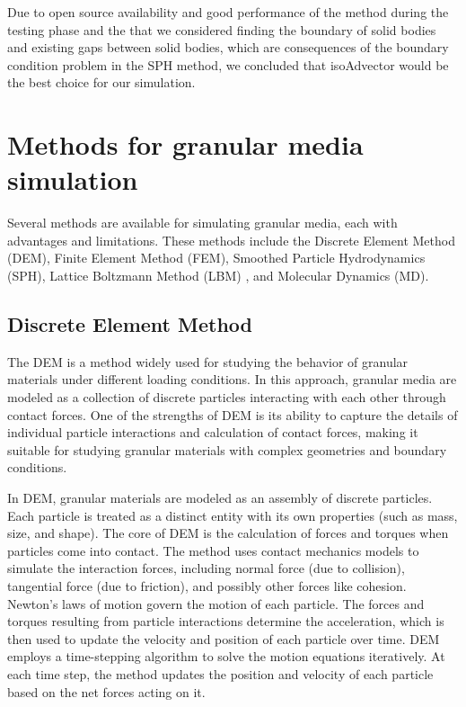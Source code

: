 Due to open source availability and good performance of the method during the testing phase and the that we considered finding the boundary of solid bodies and existing gaps between solid bodies, which are consequences of the boundary condition problem in the SPH method, we concluded that isoAdvector would be the best choice for our simulation.

\section{Methods for granular media simulation}

Several methods are available for simulating granular media, each with advantages and limitations. These methods include the Discrete Element Method (DEM)\cite{cundall1979discrete}, Finite Element Method (FEM), Smoothed Particle Hydrodynamics (SPH)\cite{monaghan1994SPH}, Lattice Boltzmann Method (LBM) \cite{chen1998lattice} \cite{begum2008lattice}, and Molecular Dynamics (\ac{MD}).

\subsection{Discrete Element Method}
The DEM is a method widely used for studying the behavior of granular materials under different loading conditions. In this approach, granular media are modeled as a collection of discrete particles interacting with each other through contact forces. One of the strengths of DEM is its ability to capture the details of individual particle interactions and calculation of contact forces, making it suitable for studying granular materials with complex geometries and boundary conditions.

In DEM, granular materials are modeled as an assembly of discrete particles. Each particle is treated as a distinct entity with its own properties (such as mass, size, and shape). The core of DEM is the calculation of forces and torques when particles come into contact. The method uses contact mechanics models to simulate the interaction forces, including normal force (due to collision), tangential force (due to friction), and possibly other forces like cohesion. Newton's laws of motion govern the motion of each particle. The forces and torques resulting from particle interactions determine the acceleration, which is then used to update the velocity and position of each particle over time. DEM employs a time-stepping algorithm to solve the motion equations iteratively. At each time step, the method updates the position and velocity of each particle based on the net forces acting on it. 

